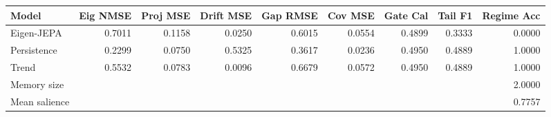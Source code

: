 \begin{tabular}{lrrrrrrrr}
\toprule
Model & Eig NMSE & Proj MSE & Drift MSE & Gap RMSE & Cov MSE & Gate Cal & Tail F1 & Regime Acc \\
\midrule
Eigen-JEPA & 0.7011 & 0.1158 & 0.0250 & 0.6015 & 0.0554 & 0.4899 & 0.3333 & 0.0000 \\
Persistence & 0.2299 & 0.0750 & 0.5325 & 0.3617 & 0.0236 & 0.4950 & 0.4889 & 1.0000 \\
Trend & 0.5532 & 0.0783 & 0.0096 & 0.6679 & 0.0572 & 0.4950 & 0.4889 & 1.0000 \\
\midrule
Memory size & \multicolumn{8}{r}{2.0000} \\
Mean salience & \multicolumn{8}{r}{0.7757} \\
\bottomrule
\end{tabular}